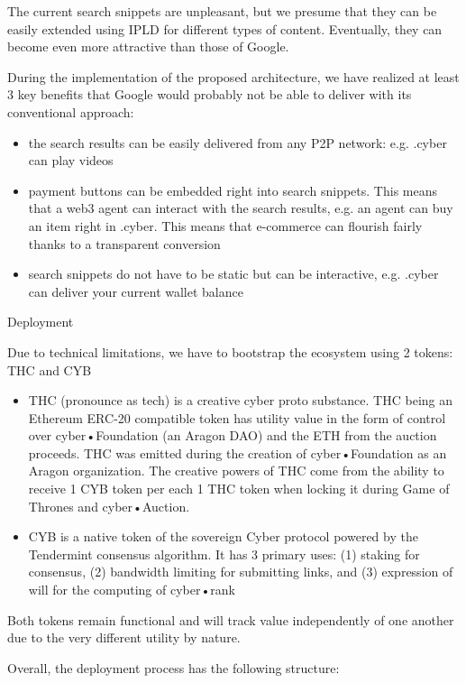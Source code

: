 \documentclass[8pt,oneside]{amsart}
\makeatletter
\renewcommand\subsection{\@startsection{subsection}
                                    {2}{\z@}
                                    {-3.25ex\@plus -1ex \@minus -.2ex}
                                    {0ex \@plus .2ex}
                                    {\play\Large}
                        }
\newcommand{\titleSection}[1]{\subsection{#1}}
\newcommand{\code}[1]{{\PlayBold #1}}
\makeatother
\begin{document}
The current search snippets are unpleasant, but we presume that they can be easily extended using IPLD for different types of content. Eventually, they can become even more attractive than those of Google.

During the implementation of the proposed architecture, we have realized at least 3 key benefits that Google would probably not be able to deliver with its conventional approach:

\begin{itemize}
\item the search results can be easily delivered from any P2P network: e.g. .cyber can play videos
\item payment buttons can be embedded right into search snippets. This means that a web3 agent can interact with the search results, e.g. an agent can buy an item right in \code{.cyber}. This means that e-commerce can flourish fairly thanks to a transparent conversion
\item search snippets do not have to be static but can be interactive, e.g. \code{.cyber} can deliver your current wallet balance
\end{itemize}

\titleSection{Deployment}\label{Deployment}

Due to technical limitations, we have to bootstrap the ecosystem using 2 tokens: THC and CYB

\begin{itemize}
\item THC (pronounce as tech) is a creative cyber proto substance. THC being an Ethereum ERC-20 compatible token has utility value in the form of control over cyber•Foundation (an Aragon DAO) and the ETH from the auction proceeds. THC was emitted during the creation of cyber•Foundation as an Aragon organization. The creative powers of THC come from the ability to receive 1 CYB token per each 1 THC token when locking it during Game of Thrones and cyber•Auction.
\item CYB is a native token of the sovereign Cyber protocol powered by the Tendermint consensus algorithm. It has 3 primary
uses: (1) staking for consensus, (2) bandwidth limiting for submitting links, and (3) expression of will for the computing
of cyber•rank
\end{itemize}

Both tokens remain functional and will track value independently of one another due to the very different utility by nature.

Overall, the deployment process has the following structure:
\end{document}

